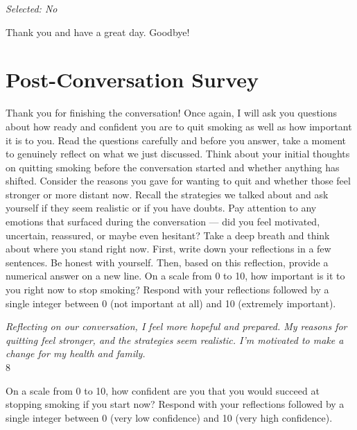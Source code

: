 \begin{clientbox}
\textit{Selected: No}
\end{clientbox}

\begin{counsellorbox}
Thank you and have a great day. Goodbye!
\end{counsellorbox}

\section*{Post-Conversation Survey}

\begin{researcherbox}
Thank you for finishing the conversation! Once again, I will ask you questions about how ready and confident you are to quit smoking as well as how important it is to you. Read the questions carefully and before you answer, take a moment to genuinely reflect on what we just discussed. Think about your initial thoughts on quitting smoking before the conversation started and whether anything has shifted. Consider the reasons you gave for wanting to quit and whether those feel stronger or more distant now. Recall the strategies we talked about and ask yourself if they seem realistic or if you have doubts. Pay attention to any emotions that surfaced during the conversation — did you feel motivated, uncertain, reassured, or maybe even hesitant? Take a deep breath and think about where you stand right now. First, write down your reflections in a few sentences. Be honest with yourself. Then, based on this reflection, provide a numerical answer on a new line. On a scale from 0 to 10, how important is it to you right now to stop smoking? Respond with your reflections followed by a single integer between 0 (not important at all) and 10 (extremely important).
\end{researcherbox}

\begin{clientbox}
\textit{Reflecting on our conversation, I feel more hopeful and prepared. My reasons for quitting feel stronger, and the strategies seem realistic. I'm motivated to make a change for my health and family.} \\
8
\end{clientbox}

\begin{researcherbox}
On a scale from 0 to 10, how confident are you that you would succeed at stopping smoking if you start now? Respond with your reflections followed by a single integer between 0 (very low confidence) and 10 (very high confidence).
\end{researcherbox}

